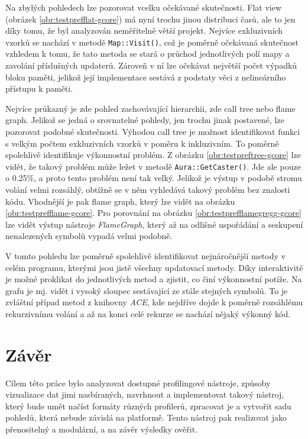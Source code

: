 \documentclass[czech,BP]{thesiskiv}
\begin{document}
Na zbylých pohledech lze pozorovat vcelku očekávané skutečnosti. Flat view (obrázek \ref{obr:testprefflat-gcore}) má nyní trochu jinou distribuci časů, ale to jen díky tomu, že byl analyzován neměřitelně větší projekt. Nejvíce exkluzivních vzorků se nachází v metodě \texttt{Map::Visit()}, což je poměrně očekávaná skutečnost vzhledem k tomu, že tato metoda se stará o průchod jednotlivých polí mapy a zavolání příslušných updaterů. Zároveň v ní lze očekávat největší počet výpadků bloku paměti, jelikož její implementace sestává z podstaty věci z nelineárního přístupu k paměti.

Nejvíce průkazný je zde pohled zachovávající hierarchii, zde call tree nebo flame graph. Jelikož se jedná o srovnatelné pohledy, jen trochu jinak postavené, lze pozorovat podobné skutečnosti. Výhodou call tree je možnost identifikovat funkci s velkým počtem exkluzivních vzorků v poměru k inkluzivním. To poměrně spolehlivě identifikuje výkonnostní problém. Z obrázku \ref{obr:testpreftree-gcore} lze vidět, že takový problém může ležet v metodě \texttt{Aura::GetCaster()}. Jde ale pouze o 0.25\%, a proto tento problém není tak velký. Jelikož je výstup v podobě stromu volání velmi rozsáhlý, obtížně se v něm vyhledává takový problém bez znalosti kódu. Vhodnější je pak flame graph, který lze vidět na obrázku \ref{obr:testprefflame-gcore}. Pro porovnání na obrázku \ref{obr:testprefflamegregg-gcore} lze vidět výstup nástroje \emph{FlameGraph}, který až na odlišné uspořádání a seskupení nenalezených symbolů vypadá velmi podobně.

V tomto pohledu lze poměrně spolehlivě identifikovat nejnáročnější metody v celém programu, kterými jsou jistě všechny updatovací metody. Díky interaktivitě je možné proklikat do jednotlivých metod a zjistit, co činí výkonnostní potíže. Na grafu je mj. vidět i vysoký sloupec sestávající ze stále stejných symbolů. To je zvláštní případ metod z knihovny \emph{ACE}, kde nejdříve dojde k poměrně rozsáhlému rekurzivnímu volání a až na konci celé rekurze se nachází nějaký výkonný kód. 




\newpage

\chapter{Závěr}

Cílem této práce bylo analyzovat dostupné profilingové nástroje, způsoby vizualizace dat jimi nasbíraných, navrhnout a implementovat takový nástroj, který bude umět načíst formáty různých profilerů, zpracovat je a vytvořit sadu pohledů, která nebude závislá na platformě. Tento nástroj pak realizovat jako přenositelný a modulární, a na závěr výsledky ověřit.
\end{document}
